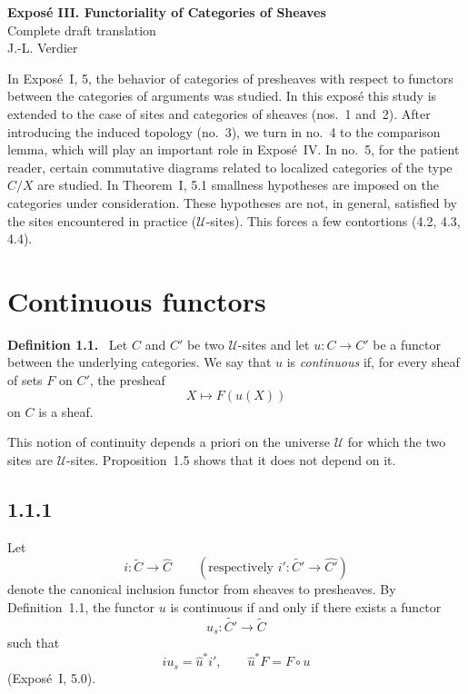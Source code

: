 \documentclass[11pt]{article}
\newcommand{\U}{\mathcal{U}}
\newenvironment{statement}[1]{\par\medskip\noindent\textbf{#1.}\ }{\par\medskip}
\begin{document}
\begin{center}
{\Large \textbf{Expos\'e III. Functoriality of Categories of Sheaves}}\\[0.35em]
{\large Complete draft translation}\\[0.35em]
J.-L. Verdier
\end{center}

\bigskip


\bigskip

In Expos\'e~I, 5, the behavior of categories of presheaves with respect to functors between the categories of arguments was studied. In this expos\'e this study is extended to the case of sites and categories of sheaves (nos.~1 and~2). After introducing the induced topology (no.~3), we turn in no.~4 to the comparison lemma, which will play an important role in Expos\'e~IV. In no.~5, for the patient reader, certain commutative diagrams related to localized categories of the type \(C/X\) are studied. In Theorem~I, 5.1 smallness hypotheses are imposed on the categories under consideration. These hypotheses are not, in general, satisfied by the sites encountered in practice (\(\U\)-sites). This forces a few contortions (4.2, 4.3, 4.4).

\section{Continuous functors}

\begin{statement}{Definition 1.1}
Let \(C\) and \(C'\) be two \(\U\)-sites and let \(u:C\to C'\) be a functor between the underlying categories. We say that \(u\) is \emph{continuous} if, for every sheaf of sets \(F\) on \(C'\), the presheaf
\[
X\longmapsto F(u(X))
\]
on \(C\) is a sheaf.
\end{statement}

This notion of continuity depends a priori on the universe \(\U\) for which the two sites are \(\U\)-sites. Proposition~1.5 shows that it does not depend on it.

\subsection*{1.1.1}
Let
\[
i:\widetilde C\to \widehat C\qquad (\text{respectively } i':\widetilde{C'}\to \widehat{C'})
\]
denote the canonical inclusion functor from sheaves to presheaves. By Definition~1.1, the functor \(u\) is continuous if and only if there exists a functor
\[
u_s:\widetilde{C'}\to\widetilde C
\]
such that
\[
 i u_s = \widehat u^{\ast} i',\qquad \widehat u^{\ast}F=F\circ u
\]
(Expos\'e~I, 5.0).
\end{document}
